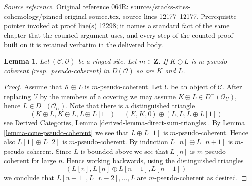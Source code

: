 \documentclass[10pt,a4paper]{amsart}
\theoremstyle{plain}
\newtheorem{lemma}[subsection]{Lemma}
\theoremstyle{definition}
\theoremstyle{remark}
\numberwithin{equation}{subsection}
\begin{document}
\noindent\textit{Source reference.} Original reference 064R: sources/stacks-sites-cohomology/pinned-original-source.tex, source lines 12177--12177. Prerequisite pointer invoked at proof line(s) 12298; it names a standard fact of the same chapter that the counted argument uses, and every step of the counted proof built on it is retained verbatim in the delivered body.\par\medskip
\begin{lemma}
\label{lemma-summands-pseudo-coherent}
Let $(\mathcal{C}, \mathcal{O})$ be a ringed site. Let $m \in \mathbf{Z}$.
If $K \oplus L$ is $m$-pseudo-coherent (resp.\ pseudo-coherent)
in $D(\mathcal{O})$ so are $K$ and $L$.
\end{lemma}

\begin{proof}
Assume that $K \oplus L$ is $m$-pseudo-coherent. Let $U$ be an object of
$\mathcal{C}$. After replacing $U$ by the members of a covering we may
assume $K \oplus L \in D^-(\mathcal{O}_U)$, hence $L \in D^-(\mathcal{O}_U)$.
Note that there is a distinguished triangle
$$
(K \oplus L, K \oplus L, L \oplus L[1]) =
(K, K, 0) \oplus (L, L, L \oplus L[1])
$$
see
Derived Categories, Lemma \ref{derived-lemma-direct-sum-triangles}.
By
Lemma \ref{lemma-cone-pseudo-coherent}
we see that $L \oplus L[1]$ is $m$-pseudo-coherent.
Hence also $L[1] \oplus L[2]$ is $m$-pseudo-coherent.
By induction $L[n] \oplus L[n + 1]$ is $m$-pseudo-coherent.
Since $L$ is bounded above we see that $L[n]$ is $m$-pseudo-coherent
for large $n$. Hence working backwards, using the distinguished triangles
$$
(L[n], L[n] \oplus L[n - 1], L[n - 1])
$$
we conclude that $L[n - 1], L[n - 2], \ldots, L$ are $m$-pseudo-coherent
as desired.
\end{proof}
\end{document}
